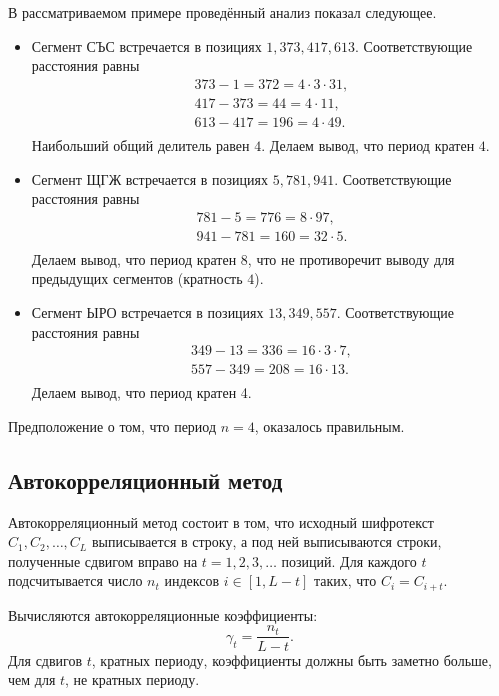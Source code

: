 В рассматриваемом примере проведённый анализ показал следующее.
\begin{itemize}
    \item Сегмент СЪС встречается в позициях $1, 373, 417, 613$. Соответствующие расстояния равны
        \[ \begin{array}{l}
            373 - 1 = 372 = 4 \cdot 3 \cdot 31, \\
            417 - 373= 44 = 4 \cdot 11, \\
            613 - 417 = 196 = 4 \cdot 49. \\
        \end{array} \]
        Наибольший общий делитель равен $4$. Делаем вывод, что период кратен $4$.
    \item Сегмент ЩГЖ встречается в позициях $5, 781, 941$. Соответствующие расстояния равны
        \[ \begin{array}{l}
            781 - 5 = 776 = 8 \cdot 97, \\
            941 - 781 = 160 = 32 \cdot 5. \\
        \end{array} \]
        Делаем вывод, что период кратен $8$, что не противоречит выводу для предыдущих сегментов (кратность $4$).
    \item Сегмент ЫРО встречается в позициях $13, 349, 557$. Соответствующие расстояния равны
        \[ \begin{array}{l}
            349 - 13 = 336 = 16 \cdot 3 \cdot 7, \\
            557 - 349 = 208 = 16 \cdot 13. \\
        \end{array} \]
        Делаем вывод, что период кратен 4.
\end{itemize}

Предположение о том, что период $n=4$, оказалось правильным.
\exampleend


\subsection{Автокорреляционный метод}

Автокорреляционный метод состоит в том, что исходный шифротекст $C_{1},C_{2}, \ldots, C_{L}$ выписывается в строку, а под ней выписываются строки, полученные сдвигом вправо на $t =1, 2, 3, \ldots$ позиций. Для каждого $t$ подсчитывается число $n_{t}$ индексов $i \in \left[ {1,L - t} \right]$ таких, что $C_i  = C_{i + t}$.

Вычисляются автокорреляционные коэффициенты:
    \[ \gamma_t  = \frac{n_t}{L - t}. \]
Для сдвигов $t$, кратных периоду, коэффициенты должны быть заметно больше, чем для $t$, не кратных периоду.

